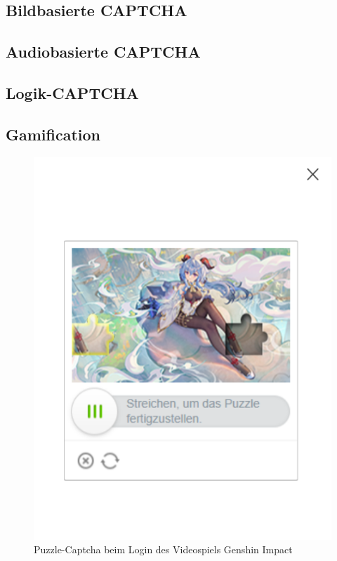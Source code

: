 \subsection{Bildbasierte CAPTCHA}
\subsection{Audiobasierte CAPTCHA}
\subsection{Logik-CAPTCHA}
\subsection{Gamification}

\begin{figure}
    \centering
    \includegraphics{gfx/mygraphics/genshincaptcha.png}
    \caption{Puzzle-Captcha beim Login des Videospiels Genshin Impact}
    \label{fig:genshincaptcha}
\end{figure}

